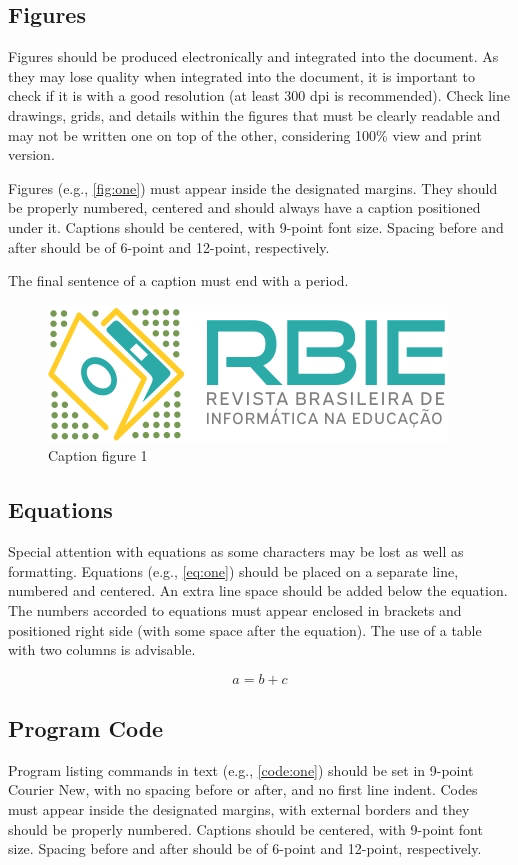 \documentclass[english, spanish,brazilian]{RBIEarticle} %
\begin{document}
\begin{itemize}
\subsection{Figures}
Figures should be produced electronically and integrated into the document. As they may lose quality when integrated into the document, it is important to check if it is with a good resolution (at least 300 dpi is recommended). Check line drawings, grids, and details within the figures that must be clearly readable and may not be written one on top of the other, considering 100\% view and print version.

Figures (e.g., \autoref{fig:one}) must appear inside the designated margins. They should be properly numbered, centered and should always have a caption positioned under it. Captions should be centered, with 9-point font size. Spacing before and after should be of 6-point and 12-point, respectively.

The final sentence of a caption must end with a period. 

\begin{figure}[h]
	\centerline{\includegraphics[scale=0.25]{newlogo.png}}
	\caption{Caption figure 1}
	\label{fig:one}
\end{figure}


\subsection{Equations}
Special attention with equations as some characters may be lost as well as formatting. Equations (e.g., \autoref{eq:one}) should be placed on a separate line, numbered and centered. An extra line space should be added below the equation. The numbers accorded to equations must appear enclosed in brackets and positioned right side (with some space after the equation).
The use of a table with two columns is advisable.

\begin{equation}
	a = b + c
	\label{eq:one}
\end{equation}


\subsection{Program Code}
Program listing commands in text (e.g., \autoref{code:one}) should be set in 9-point Courier New, with no spacing before or after, and no first line indent. Codes must appear inside the designated margins, with external borders and they should be properly numbered. Captions should be centered, with 9-point font size. Spacing before and after should be of 6-point and 12-point, respectively.


\end{itemize}
\end{document}
